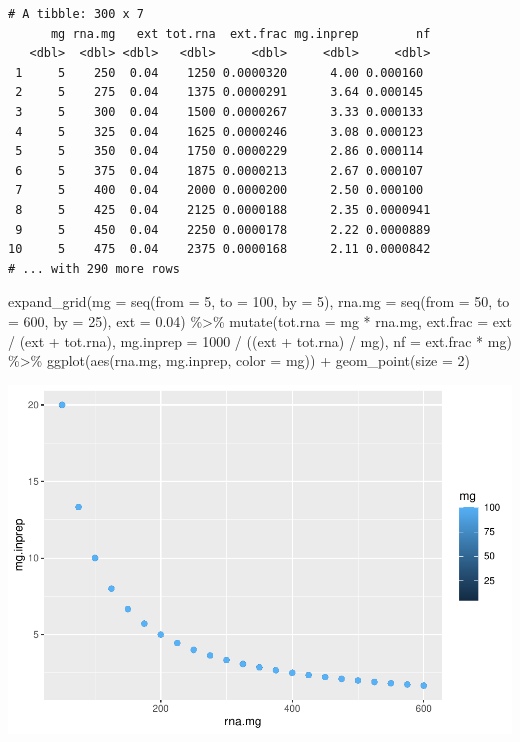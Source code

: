 \documentclass[twoside,10pt]{gihclass} %
\newenvironment{Shaded}{\begin{snugshade}}{\end{snugshade}}
\newcommand{\AttributeTok}[1]{\textcolor[rgb]{0.77,0.63,0.00}{#1}}
\newcommand{\DecValTok}[1]{\textcolor[rgb]{0.00,0.00,0.81}{#1}}
\newcommand{\FloatTok}[1]{\textcolor[rgb]{0.00,0.00,0.81}{#1}}
\newcommand{\FunctionTok}[1]{\textcolor[rgb]{0.00,0.00,0.00}{#1}}
\newcommand{\NormalTok}[1]{#1}
\newcommand{\SpecialCharTok}[1]{\textcolor[rgb]{0.00,0.00,0.00}{#1}}
\begin{document}
\begin{verbatim}
# A tibble: 300 x 7
      mg rna.mg   ext tot.rna  ext.frac mg.inprep        nf
   <dbl>  <dbl> <dbl>   <dbl>     <dbl>     <dbl>     <dbl>
 1     5    250  0.04    1250 0.0000320      4.00 0.000160 
 2     5    275  0.04    1375 0.0000291      3.64 0.000145 
 3     5    300  0.04    1500 0.0000267      3.33 0.000133 
 4     5    325  0.04    1625 0.0000246      3.08 0.000123 
 5     5    350  0.04    1750 0.0000229      2.86 0.000114 
 6     5    375  0.04    1875 0.0000213      2.67 0.000107 
 7     5    400  0.04    2000 0.0000200      2.50 0.000100 
 8     5    425  0.04    2125 0.0000188      2.35 0.0000941
 9     5    450  0.04    2250 0.0000178      2.22 0.0000889
10     5    475  0.04    2375 0.0000168      2.11 0.0000842
# ... with 290 more rows
\end{verbatim}
\begin{Shaded}
\begin{Highlighting}[]
\FunctionTok{expand\_grid}\NormalTok{(}\AttributeTok{mg =} \FunctionTok{seq}\NormalTok{(}\AttributeTok{from =} \DecValTok{5}\NormalTok{, }\AttributeTok{to =} \DecValTok{100}\NormalTok{, }\AttributeTok{by =} \DecValTok{5}\NormalTok{), }
            \AttributeTok{rna.mg =} \FunctionTok{seq}\NormalTok{(}\AttributeTok{from =} \DecValTok{50}\NormalTok{, }\AttributeTok{to =} \DecValTok{600}\NormalTok{, }\AttributeTok{by =} \DecValTok{25}\NormalTok{),}
            \AttributeTok{ext =} \FloatTok{0.04}\NormalTok{) }\SpecialCharTok{\%\textgreater{}\%}
  \FunctionTok{mutate}\NormalTok{(}\AttributeTok{tot.rna =}\NormalTok{ mg }\SpecialCharTok{*}\NormalTok{ rna.mg, }
         \AttributeTok{ext.frac =}\NormalTok{ ext }\SpecialCharTok{/}\NormalTok{ (ext }\SpecialCharTok{+}\NormalTok{ tot.rna), }
         \AttributeTok{mg.inprep =} \DecValTok{1000} \SpecialCharTok{/}\NormalTok{ ((ext }\SpecialCharTok{+}\NormalTok{ tot.rna) }\SpecialCharTok{/}\NormalTok{ mg), }
         \AttributeTok{nf =}\NormalTok{ ext.frac }\SpecialCharTok{*}\NormalTok{ mg) }\SpecialCharTok{\%\textgreater{}\%}
         \FunctionTok{ggplot}\NormalTok{(}\FunctionTok{aes}\NormalTok{(rna.mg, mg.inprep,  }\AttributeTok{color =}\NormalTok{ mg)) }\SpecialCharTok{+} \FunctionTok{geom\_point}\NormalTok{(}\AttributeTok{size =} \DecValTok{2}\NormalTok{)}
\end{Highlighting}
\end{Shaded}
\includegraphics{thesis_files/figure-latex/unnamed-chunk-1-1.pdf}
\end{document}
